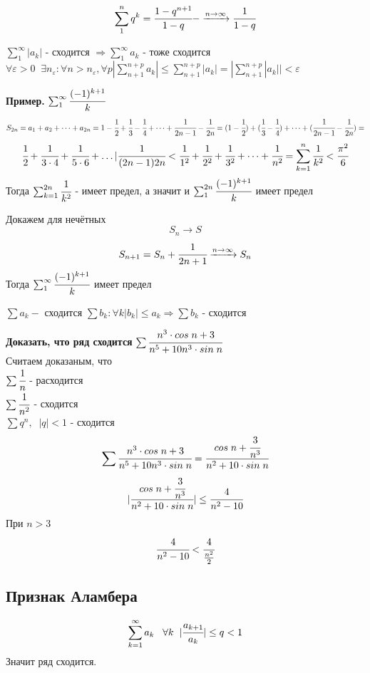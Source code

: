 \documentclass[12pt, paper]{article}
\begin{document}
\begin{tcolorbox}[title=Ряд геометрической прогресии]
    \[ \sum_1^n q^k = \cfrac{1-q^{n+1}}{1-q} - \xrightarrow{n\to \infty} \cfrac{1}{1-q} \]
\end{tcolorbox}

$ \sum_1^\infty |a_k| $ - сходится $\Rightarrow \sum_1^\infty a_k $ - тоже сходится \\
$ \forall \varepsilon > 0\;\; \exists n_\varepsilon: \forall n > n_\varepsilon, \forall p |\sum^{n+p}_{n+1} a_k| \leq \sum^{n+p}_{n+1} |a_k| = |\sum^{n+p}_{n+1} |a_k|| < \varepsilon $

\textbf{Пример. } $ \sum_1^\infty\cfrac{(-1)^{k+1}}{k} $
\[ S_{2n} = a_1 + a_2 + \dots + a_{2n} = 1 - \cfrac{1}{2} + \cfrac{1}{3} - \cfrac{1}{4} + \dots + \cfrac{1}{2n-1} - \cfrac{1}{2n} = (1 - \cfrac{1}{2}) + (\cfrac{1}{3} - \cfrac{1}{4}) + \dots + (\cfrac{1}{2n-1} - \cfrac{1}{2n}) = \]
\[ \cfrac{1}{2} + \cfrac{1}{3\cdot4} + \cfrac{1}{5\cdot6} + \dots | \cfrac{1}{(2n-1)2n} < \cfrac{1}{1^2}+ \cfrac{1}{2^2}+\cfrac{1}{3^2}+\dots+\cfrac{1}{n^2} = \sum_{k=1}^{n} \cfrac{1}{k^2} < \cfrac{\pi^2}{6} \]
Тогда 
$ \sum_{k=1}^{2n} \cfrac{1}{k^2} $ - имеет предел, а значит и $ \sum_1^{2n}\cfrac{(-1)^{k+1}}{k} $ имеет предел

Докажем для нечётных
\[ S_n \to S \]
\[ S_{n+1} = S_n + \cfrac{1}{2n+1} \xrightarrow{n\to\infty} S_n \]
Тогда $ \sum_1^\infty\cfrac{(-1)^{k+1}}{k} $ имеет предел


\begin{tcolorbox}
    $ \sum a_k -$ сходится $ \sum b_k: \forall k |b_k| \leq a_k \Rightarrow \sum b_k$ - сходится
\end{tcolorbox}

\textbf{Доказать, что ряд сходится} $ \sum \cfrac{n^3\cdot cos\; n + 3}{n^5 + 10n^3 \cdot sin\;n} $\\
Считаем доказаным, что \\
$ \sum \cfrac{1}{n} $ - расходится\\
$ \sum \cfrac{1}{n^2} $ - сходится\\
$ \sum q^n,\;\; |q| < 1 $ - сходится\\

\[ \sum \cfrac{n^3\cdot cos\; n + 3}{n^5 + 10n^3 \cdot sin\;n} = \cfrac{cos\;n+\cfrac{3}{n^3}}{n^2+10\cdot sin\;n} \]
\[ |\cfrac{cos\;n+\cfrac{3}{n^3}}{n^2+10\cdot sin\;n}| \leq \cfrac{4}{n^2-10} \]
При $ n > 3$
\[ \cfrac{4}{n^2-10} < \cfrac{4}{\frac{n^2}{2}} \]

\subsection{Признак Аламбера}
\begin{tcolorbox}[title=признак Аламбера]
    \[ \sum_{k=1}^{\infty} a_k \;\;\;\forall k\;\; |\cfrac{a_{k+1}}{a_k}| \leq q < 1 \]
    Значит ряд сходится.
\end{tcolorbox}
\end{document}
